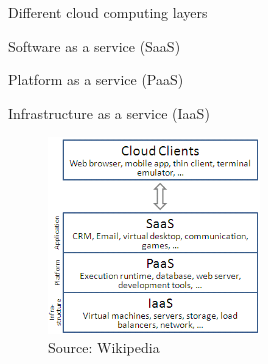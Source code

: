\begin{frame}{Different cloud computing layers}
\BI
\item Software as a service (SaaS)
\item Platform as a service (PaaS)
\item Infrastructure as a service (IaaS)
\EI

\begin{figure}
\includegraphics[width=0.5\textwidth]{cloud_computing_layers.png}	
\caption{Source: Wikipedia}
\end{figure}


\end{frame}

